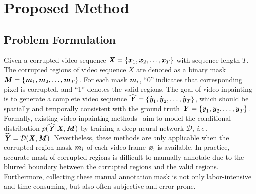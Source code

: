 \section{Proposed Method}
\label{Method}
\subsection{Problem Formulation}
\label{Problem Formulation}
Given a corrupted video sequence $\textbf{\emph{X}}=\{\textbf{\emph{x}}_1,\textbf{\emph{x}}_2,\dots,\textbf{\emph{x}}_T\}$ with sequence length $T$. 
The corrupted regions of video sequence $X$ are denoted as a binary mask $\textbf{\emph{M}}=\{\textbf{\emph{m}}_1,\textbf{\emph{m}}_2, \dots,\\
\textbf{\emph{m}}_T\}$. 
For each mask $\textbf{\emph{m}}_i$, “0” indicates that corresponding pixel is corrupted, and “1” denotes the valid regions.  
The goal of video inpainting is to generate a complete video sequence $\widehat{\textbf{\emph{Y}}}=\{\widehat{\textbf{\emph{y}}}_1,\widehat{\textbf{\emph{y}}}_2 ,\dots,\widehat{\textbf{\emph{y}}}_T\}$, which should be spatially and temporally consistent with the ground truth $\textbf{\emph{Y}}=\{\textbf{\emph{y}}_1, \textbf{\emph{y}}_2,\dots, \textbf{\emph{y}}_T\}$. Formally, existing video inpainting methods~\cite{cai2022devit,liu2021fuseformer,Ren_2022_CVPR,yan2020sttn,zhang2022flow} aim
to model the conditional distribution $p(\widehat{\textbf{\emph{Y}}}|\textbf{\emph{X}},\textbf{\emph{M}})$ by training a deep neural network $\mathcal{D}$, \emph{i.e.}, $\widehat{\textbf{\emph{Y}}}=\mathcal{D}(\textbf{\emph{X}},\textbf{\emph{M}})$. 
Nevertheless, these methods are only applicable
when the corrupted region mask $\textbf{\emph{m}}_i$ of each video frame $\textbf{\emph{x}}_i$ is available. 
In practice,
accurate mask of corrupted regions is difficult to manually annotate due to the blurred boundary between the corrupted regions and the valid regions.
Furthermore, collecting these manual annotation mask is not only labor-intensive and time-consuming,
but also often subjective and error-prone.


